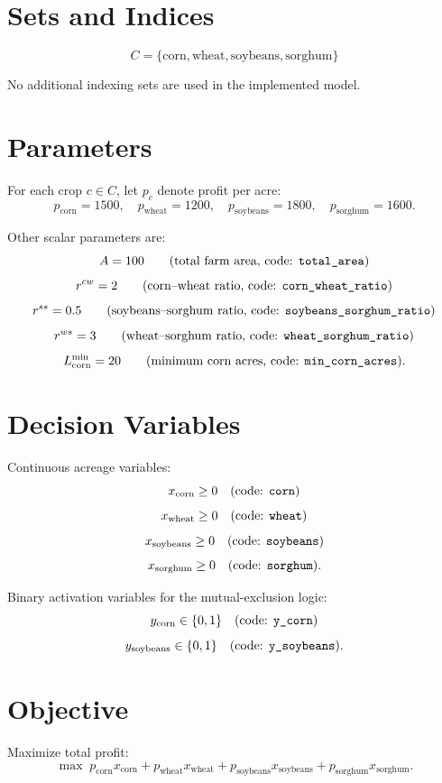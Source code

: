 \section*{Sets and Indices}

\[
C = \{\text{corn},\text{wheat},\text{soybeans},\text{sorghum}\}
\]

No additional indexing sets are used in the implemented model.

\section*{Parameters}

For each crop \(c \in C\), let \(p_c\) denote profit per acre:
\[
p_{\text{corn}}=1500,\quad
p_{\text{wheat}}=1200,\quad
p_{\text{soybeans}}=1800,\quad
p_{\text{sorghum}}=1600.
\]

Other scalar parameters are:
\[
A = 100
\qquad\text{(total farm area, code: \texttt{total\_area})}
\]
\[
r^{cw} = 2
\qquad\text{(corn--wheat ratio, code: \texttt{corn\_wheat\_ratio})}
\]
\[
r^{ss} = 0.5
\qquad\text{(soybeans--sorghum ratio, code: \texttt{soybeans\_sorghum\_ratio})}
\]
\[
r^{ws} = 3
\qquad\text{(wheat--sorghum ratio, code: \texttt{wheat\_sorghum\_ratio})}
\]
\[
L^{\min}_{\text{corn}} = 20
\qquad\text{(minimum corn acres, code: \texttt{min\_corn\_acres})}.
\]

\section*{Decision Variables}

Continuous acreage variables:
\[
x_{\text{corn}} \ge 0 \quad \text{(code: \texttt{corn})}
\]
\[
x_{\text{wheat}} \ge 0 \quad \text{(code: \texttt{wheat})}
\]
\[
x_{\text{soybeans}} \ge 0 \quad \text{(code: \texttt{soybeans})}
\]
\[
x_{\text{sorghum}} \ge 0 \quad \text{(code: \texttt{sorghum})}.
\]

Binary activation variables for the mutual-exclusion logic:
\[
y_{\text{corn}} \in \{0,1\}
\quad \text{(code: \texttt{y\_corn})}
\]
\[
y_{\text{soybeans}} \in \{0,1\}
\quad \text{(code: \texttt{y\_soybeans})}.
\]

\section*{Objective}

Maximize total profit:
\[
\max \;
p_{\text{corn}}x_{\text{corn}}
+ p_{\text{wheat}}x_{\text{wheat}}
+ p_{\text{soybeans}}x_{\text{soybeans}}
+ p_{\text{sorghum}}x_{\text{sorghum}}.
\]

